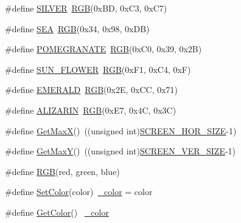 \begin{DoxyCompactItemize}
$$\item 
\#define \hyperlink{group___s_s_d1289_ga7e76a14a479114a4b9b20782bb00e69a}{S\+I\+L\+V\+E\+R}~\hyperlink{group___s_s_d1289_gaf1b70705887a3d5f250f1a1b31a98a22}{R\+G\+B}(0x\+B\+D, 0x\+C3, 0x\+C7)
\item 
\#define \hyperlink{group___s_s_d1289_gae735b282657a5b67b589213f9e6b1ea7}{S\+E\+A}~\hyperlink{group___s_s_d1289_gaf1b70705887a3d5f250f1a1b31a98a22}{R\+G\+B}(0x34, 0x98, 0x\+D\+B)
\item 
\#define \hyperlink{group___s_s_d1289_ga9351998a06712daf19dda267d367074f}{P\+O\+M\+E\+G\+R\+A\+N\+A\+T\+E}~\hyperlink{group___s_s_d1289_gaf1b70705887a3d5f250f1a1b31a98a22}{R\+G\+B}(0x\+C0, 0x39, 0x2\+B)
\item 
\#define \hyperlink{group___s_s_d1289_ga63c6efb1d85af83ec0f6d7259a2902c7}{S\+U\+N\+\_\+\+F\+L\+O\+W\+E\+R}~\hyperlink{group___s_s_d1289_gaf1b70705887a3d5f250f1a1b31a98a22}{R\+G\+B}(0x\+F1, 0x\+C4, 0x\+F)
\item 
\#define \hyperlink{group___s_s_d1289_gabd399af25ebee3458f72f6412cae5ae4}{E\+M\+E\+R\+A\+L\+D}~\hyperlink{group___s_s_d1289_gaf1b70705887a3d5f250f1a1b31a98a22}{R\+G\+B}(0x2\+E, 0x\+C\+C, 0x71)
\item 
\#define \hyperlink{group___s_s_d1289_ga757247aee73022fde525a5381eacf66d}{A\+L\+I\+Z\+A\+R\+I\+N}~\hyperlink{group___s_s_d1289_gaf1b70705887a3d5f250f1a1b31a98a22}{R\+G\+B}(0x\+E7, 0x4\+C, 0x3\+C)
\item 
\#define \hyperlink{group___s_s_d1289_gaee6bb27a38a7a07c6331ebcbe32a7eb9}{Get\+Max\+X}()~((unsigned int)\hyperlink{group___s_s_d1289_gafc0b164104c928412eaf08b02a01581f}{S\+C\+R\+E\+E\+N\+\_\+\+H\+O\+R\+\_\+\+S\+I\+Z\+E}-\/1)
\item 
\#define \hyperlink{group___s_s_d1289_ga30e4b7857288a0135a2b397c962d6c87}{Get\+Max\+Y}()~((unsigned int)\hyperlink{group___s_s_d1289_ga622fb88b83c1fc50272413188f65e5ea}{S\+C\+R\+E\+E\+N\+\_\+\+V\+E\+R\+\_\+\+S\+I\+Z\+E}-\/1)
\item 
\#define \hyperlink{group___s_s_d1289_gaf1b70705887a3d5f250f1a1b31a98a22}{R\+G\+B}(red,  green,  blue)
\item 
\#define \hyperlink{group___s_s_d1289_ga94d4d185697c04f247458432a5611a8c}{Set\+Color}(color)~\hyperlink{group___s_s_d1289_ga00cf2e4785ac08040a181b166e244e4c}{\+\_\+color} = color
\item 
\#define \hyperlink{group___s_s_d1289_ga0eb009d359fe9f8ec383fd9fa31f7c33}{Get\+Color}()        ~\hyperlink{group___s_s_d1289_ga00cf2e4785ac08040a181b166e244e4c}{\+\_\+color}
\end{DoxyCompactItemize}
